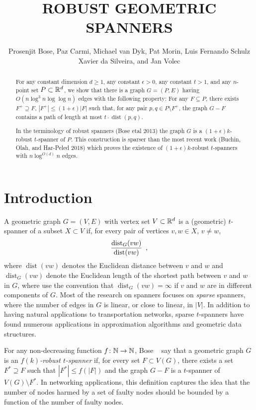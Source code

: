 \documentclass{patmorin}
\title{\MakeUppercase{Robust Geometric Spanners}}
\author{Prosenjit Bose, Paz Carmi, Michael van Dyk, Pat Morin, 
  \newline
  Luis Fernando Schulz Xavier da Silveira,
  and Jan Volec}
\DeclareMathOperator{\dist}{dist}
\begin{document}
\maketitle


\begin{abstract}
  For any constant dimension $d\ge 1$, any constant $\epsilon >0$, any
  constant $t>1$, and any $n$-point set $P\subset\mathbb{R}^d$, we show that there
  is a graph $G=(P,E)$ having $O(n\log^3 n\log\log n)$ edges with the following
  property:  For any $F\subseteq P$, there exists $F^+\supseteq F$, $|F^+|
  \le (1+\epsilon)|F|$ such that, for any pair $p,q\in P\setminus F^+$,
  the graph $G-F$ contains a path of length at most $t\cdot\dist(p,q)$.
  
  In the terminology of robust spanners (Bose etal 2013) the graph $G$
  is a $(1+\epsilon)k$-robust $t$-spanner of $P$. This construction is
  sparser than the most recent work (Buchin, Olah, and Har-Peled 2018)
  which proves the existence of $(1+\epsilon)k$-robust $t$-spanners with
  $n\log^{O(d)} n$ edges.
\end{abstract}

\section{Introduction}

A geometric graph $G=(V,E)$ with vertex set $V\subset\mathbb{R}^d$ is a (geometric)
$t$-spanner of a subset $X\subset V$ if, for every pair of vertices
$v,w\in X$, $v\neq w$,
\begin{equation}
	\frac{\dist_G(vw)}{\dist(vw)} \enspace , \eqlabel{spanning-ratio}
\end{equation}
where $\dist(vw)$ denotes the Euclidean distance between $v$ and $w$ and
$\dist_G(vw)$ denote the Euclidean length of the shortest path between $v$
and $w$ in $G$, where use the convention that $\dist_G(vw)=\infty$ if $v$
and $w$ are in different components of $G$.  
Most of the research on spanners focuses on \emph{sparse}
spanners, where the number of edges in $G$ is linear, or close to linear,
in $|V|$.  In addition to having natural applications to transportation
networks, sparse $t$-spanners have found numerous applications in
approximation algorithms and geometric data structures.

For any non-decreasing function $f\colon\mathbb{N}\to\mathbb{N}$, Bose \etal\
\cite{bose.dujmovic.ea:robust} say that a geometric graph $G$ is an
\emph{$f(k)$-robust $t$-spanner} if, for every set $F\subset V(G)$,
there exists a set $F^*\supseteq F$ such that $|F^*|\le f(|F|)$ and
the graph $G-F$ is a $t$-spanner of $V(G)\setminus F^*$.  In networking
applications, this definition captures the idea that the number of nodes
harmed by a set of faulty nodes should be bounded by a function of the
number of faulty nodes.
\end{document}
